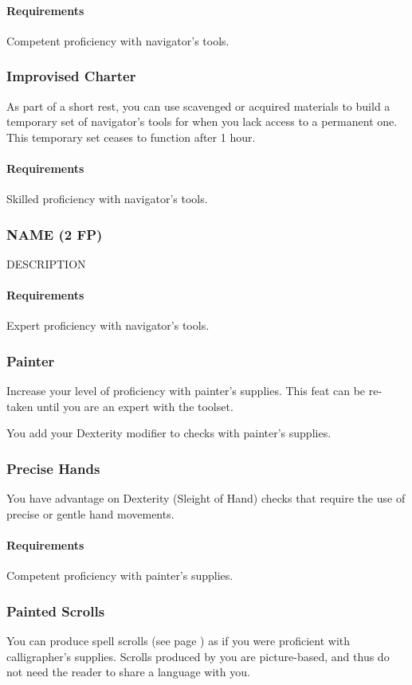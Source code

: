     \paragraph{Requirements} Competent proficiency with navigator's tools.
\subsubsection{Improvised Charter} \label{feat::improvisedcharter}
    As part of a short rest, you can use scavenged or acquired materials to build a temporary set of navigator's tools for when you lack access to a permanent one. This temporary set ceases to function after 1 hour.
    \paragraph{Requirements} Skilled proficiency with navigator's tools.
\subsubsection{NAME (2 FP)} \label{feat::name}
    DESCRIPTION
    \paragraph{Requirements} Expert proficiency with navigator's tools.

\subsubsection{Painter} \label{feat::painter}
    Increase your level of proficiency with painter's supplies.
    This feat can be re-taken until you are an expert with the toolset.

    You add your Dexterity modifier to checks with painter's supplies.
\subsubsection{Precise Hands} \label{feat::precisehands}
    You have advantage on Dexterity (Sleight of Hand) checks that require the use of precise or gentle hand movements.
    \paragraph{Requirements} Competent proficiency with painter's supplies.
\subsubsection{Painted Scrolls} \label{feat::paintedscrolls}
    You can produce spell scrolls (see page \pageref{item::spellscroll}) as if you were proficient with calligrapher's supplies.
    Scrolls produced by you are picture-based, and thus do not need the reader to share a language with you.

